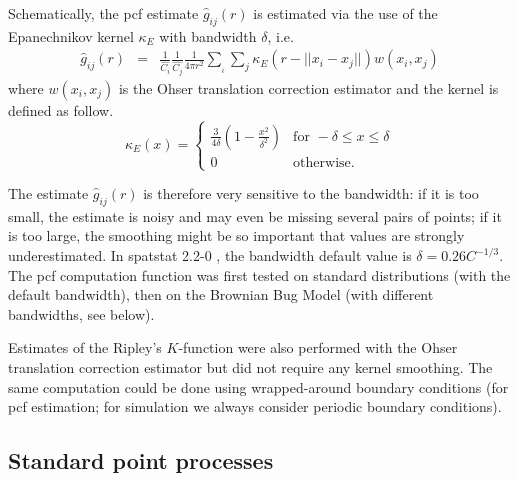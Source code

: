 \documentclass[english]{article}
\begin{document}
Schematically, the pcf estimate $\hat{g}_{ij}(r)$ is estimated via
the use of the Epanechnikov kernel $\kappa_{E}$ with bandwidth $\delta$,
i.e.
\begin{equation}
\begin{array}{ccc}
\hat{g}_{ij}(r) & = & \frac{1}{\hat{C_{i}}}\frac{1}{\hat{C_{j}}}\frac{1}{4\pi r^{2}}\sum_{_{i}}\sum_{j}\kappa_{E}(r-||x_{i}-x_{j}||)w(x_{i},x_{j})\end{array}\label{eq:pcf_estimate}
\end{equation}
where $w(x_{i},x_{j})$ is the Ohser translation correction estimator
\citep{ohser_estimators_1983} and the kernel is defined as follow.
\begin{equation}
\kappa_{E}(x)=\begin{cases}
\frac{3}{4\delta}\left(1-\frac{x^{2}}{\delta^{2}}\right) & \text{for }-\delta\leq x\leq\delta\\
0 & \text{otherwise}.
\end{cases}
\end{equation}

The estimate $\hat{g}_{ij}(r)$ is therefore very sensitive to the
bandwidth: if it is too small, the estimate is noisy and may even
be missing several pairs of points; if it is too large, the smoothing
might be so important that values are strongly underestimated. In
spatstat 2.2-0 \citep{baddeley_spatstat}, the bandwidth default value
is $\delta=0.26C^{-1/3}$. The pcf computation function was first
tested on standard distributions (with the default bandwidth), then
on the Brownian Bug Model (with different bandwidths, see below).

Estimates of the Ripley's $K$-function were also performed with the
Ohser translation correction estimator  but did not require any kernel
smoothing. The same computation could be done using wrapped-around
boundary conditions (for pcf estimation; for simulation we always
consider periodic boundary conditions).

\subsection{Standard point processes}
\end{document}

